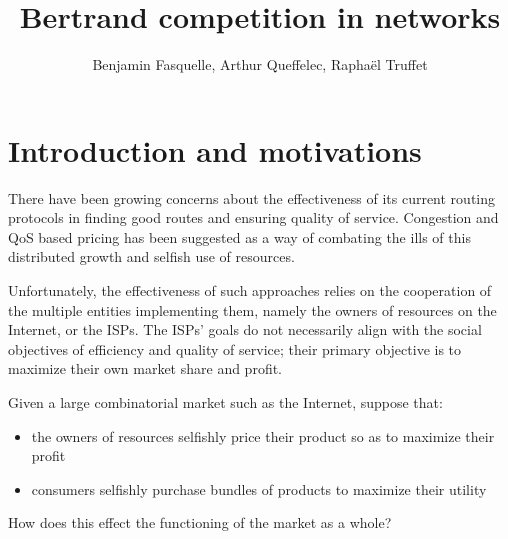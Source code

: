 \documentclass{beamer}
\title{Bertrand competition in networks}
\author{Benjamin Fasquelle, Arthur Queffelec, Raphaël Truffet}
\institute{École Normale Supérieure de Rennes, département Informatique et Télécommunications}
\begin{document}



  \begin{frame}
  \titlepage
  \end{frame}


\begin{frame}
  \tableofcontents
  \end{frame}


\section{Introduction and motivations}

\begin{frame}
There have been growing concerns about the effectiveness of its current routing protocols in finding good routes and ensuring quality
of service. Congestion and QoS based pricing has been suggested as a way of
combating the ills of this distributed growth and selfish use of resources.

Unfortunately, the effectiveness of such approaches relies on
the cooperation of the multiple entities implementing them, namely the owners
of resources on the Internet, or the ISPs. The ISPs’ goals do not necessarily
align with the social objectives of efficiency and quality of service; their primary
objective is to maximize their own market share and profit.
\end{frame}



\begin{frame}
Given a large combinatorial
market such as the Internet, suppose that:
\begin{itemize}
\item the owners of resources selfishly price
their product so as to maximize their profit
\item consumers selfishly purchase
bundles of products to maximize their utility
\end{itemize}

\begin{alertblock}{}
How does this effect the functioning
of the market as a whole?
\end{alertblock}
\end{frame}
\end{document}
